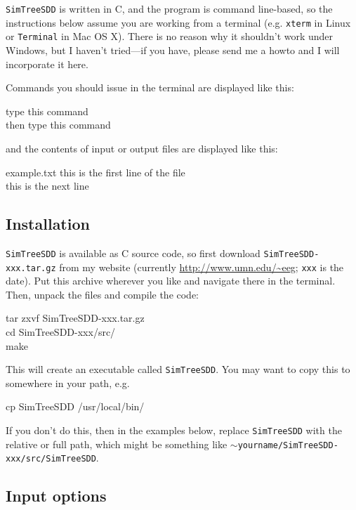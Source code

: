 \documentclass[10pt]{article}
\begin{document}
\texttt{SimTreeSDD} is written in C, and the program is command line-based, so the instructions below assume you are working from a terminal (e.g. \texttt{xterm} in Linux or \texttt{Terminal} in Mac OS X).
There is no reason why it shouldn't work under Windows, but I haven't tried---if you have, please send me a howto and I will incorporate it here.

Commands you should issue in the terminal are displayed like this:
\begin{commandis}
	type this command \\
	then type this command
\end{commandis}
and the contents of input or output files are displayed like this:
\begin{filesays}{example.txt}
	this is the first line of the file \\
	this is the next line
\end{filesays}


\subsection*{Installation}

\texttt{SimTreeSDD} is available as C source code, so first download \texttt{SimTreeSDD-xxx.tar.gz} from my website (currently \url{http://www.umn.edu/~eeg}; \texttt{xxx} is the date).
Put this archive wherever you like and navigate there in the terminal.
Then, unpack the files and compile the code:
\begin{commandis}
	tar zxvf SimTreeSDD-xxx.tar.gz	\\
	cd SimTreeSDD-xxx/src/		\\
	make
\end{commandis}
This will create an executable called \texttt{SimTreeSDD}.
You may want to copy this to somewhere in your path, e.g.
\begin{commandis}
	cp SimTreeSDD /usr/local/bin/
\end{commandis}
If you don't do this, then in the examples below, replace \texttt{SimTreeSDD} with the relative or full path, which might be something like \texttt{$\sim$yourname/SimTreeSDD-xxx/src/SimTreeSDD}.


\subsection*{Input options}
\end{document}
